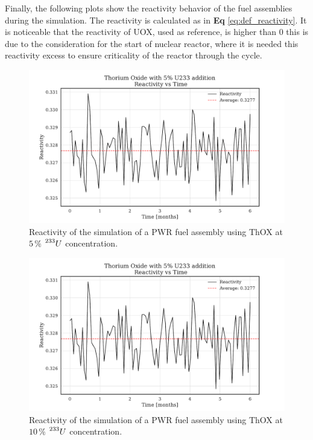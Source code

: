 Finally, the following plots show the reactivity behavior of the fuel assemblies during the simulation. The reactivity is calculated as in \textbf{Eq} \ref{eq:def_reactivity}. It is noticeable that the reactivity of UOX, used as reference, is higher than \(0\) this is due to the consideration for the start of nuclear reactor, where it is needed this reactivity excess to ensure criticality of the reactor through the cycle.

\begin{figure}
    \centering
    \includegraphics[width=1\textwidth, scale=0.5]{Kap7/Figures_Kap7/Reactivity_vs_Time_ThOX_U233_5.pdf}
    \caption{Reactivity of the simulation of a PWR fuel assembly using ThOX at \(5 \, \%\) \(\prescript{233}{}{U}\) concentration.}
    \label{fig:reactivity_th_u233_5}
\end{figure}

\begin{figure}
    \centering
    \includegraphics[width=1\textwidth, scale=0.5]{Kap7/Figures_Kap7/Reactivity_vs_Time_ThOX_U233_5.pdf}
    \caption{Reactivity of the simulation of a PWR fuel assembly using ThOX at \(10 \, \%\) \(\prescript{233}{}{U}\) concentration.}
    \label{fig:reactivity_th_u233_10}   
\end{figure}

